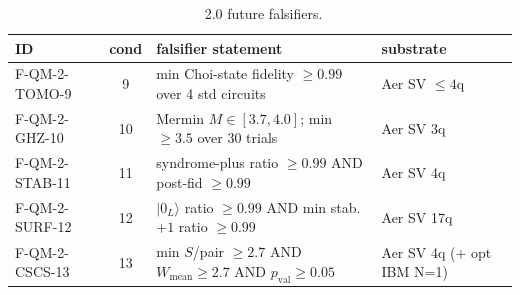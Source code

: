 \begin{table}[htbp]
\centering
\caption{\qmirror{}~2.0 future falsifiers.}
\label{tab:falsifiers_v2}
\scriptsize
\begin{tabular}{l c l l}
\toprule
ID & cond & falsifier statement & substrate \\
\midrule
F-QM-2-TOMO-9 & 9  & min Choi-state fidelity $\ge 0.99$ over 4 std circuits  & Aer SV $\le 4$q \\
F-QM-2-GHZ-10 & 10 & Mermin $M \in [3.7, 4.0]$; min $\ge 3.5$ over 30 trials & Aer SV 3q \\
F-QM-2-STAB-11 & 11 & syndrome-plus ratio $\ge 0.99$ AND post-fid $\ge 0.99$ & Aer SV 4q \\
F-QM-2-SURF-12 & 12 & $|0_{L}\rangle$ ratio $\ge 0.99$ AND min stab.\ $+1$ ratio $\ge 0.99$ & Aer SV 17q \\
F-QM-2-CSCS-13 & 13 & min $S$/pair $\ge 2.7$ AND $W_{\text{mean}} \ge 2.7$ AND $p_{\text{val}} \ge 0.05$ & Aer SV 4q (+ opt IBM N=1) \\
\bottomrule
\end{tabular}
\end{table}
